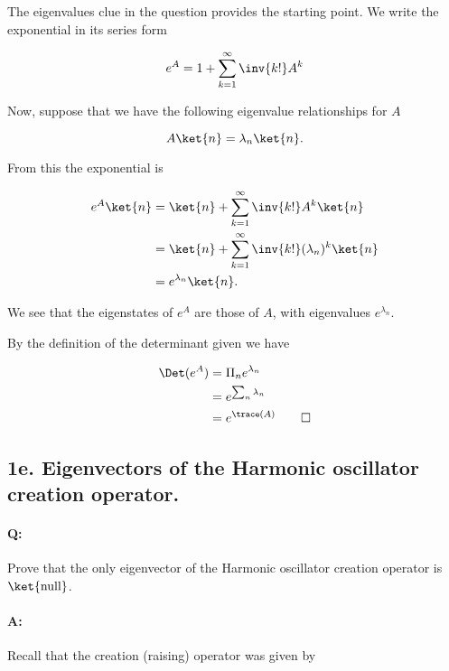 The eigenvalues clue in the question provides the starting point.  We write the exponential in its series form

\begin{equation}\label{eqn:qmIexamPractice2008Dec:1d:20}
e^A = 1 + \sum_{k=1}^\infty \inv{k!} A^k
\end{equation}

Now, suppose that we have the following eigenvalue relationships for $A$

\begin{equation}\label{eqn:qmIexamPractice2008Dec:1d:30}
A \ket{n} = \lambda_n \ket{n}.
\end{equation}

From this the exponential is

\begin{align*}
e^A \ket{n} 
&= \ket{n} + \sum_{k=1}^\infty \inv{k!} A^k \ket{n} \\
&= \ket{n} + \sum_{k=1}^\infty \inv{k!} (\lambda_n)^k \ket{n} \\
&= e^{\lambda_n} \ket{n}.
\end{align*}

We see that the eigenstates of $e^A$ are those of $A$, with eigenvalues $e^{\lambda_n}$.

By the definition of the determinant given we have

\begin{align*}
\Det( e^A ) 
&= \Pi_n e^{\lambda_n} \\
&= e^{\sum_n \lambda_n} \\
&= e^{\trace(A)} \qquad \square
\end{align*}

\subsection{1e.  Eigenvectors of the Harmonic oscillator creation operator.}

\paragraph{Q:} Prove that the only eigenvector of the Harmonic oscillator creation operator is $\ket{\text{null}}$.

\paragraph{A:} 

Recall that the creation (raising) operator was given by

